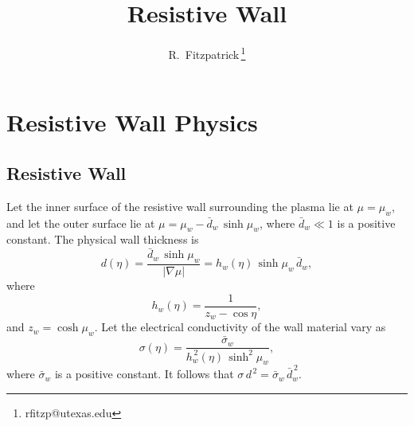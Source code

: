 \documentclass[12pt,prb,aps,notitlepage]{revtex4-1}
\begin{document}
\title{Resistive Wall}
\author{R.~Fitzpatrick\,\footnote{rfitzp@utexas.edu}}
\begin{abstract}
\end{abstract}
\maketitle

\section{Resistive Wall Physics}
\subsection{Resistive Wall}
Let the inner surface of the resistive wall surrounding the plasma lie at $\mu=\mu_w$,
and let the outer surface lie at $\mu=\mu_w-\bar{d}_w\,\sinh\mu_w$,  where $\bar{d}_w\ll 1$ is a positive constant. The physical wall thickness is
\begin{equation}
d(\eta)= \frac{\bar{d}_w\,\sinh\mu_w}{|\nabla \mu|} = h_w(\eta)\,\sinh \mu_w\,\bar{d}_w,
\end{equation}
where
\begin{equation}
h_w(\eta) = \frac{1}{z_w-\cos\eta},
\end{equation}
and $z_w=\cosh\mu_w$. 
Let the electrical conductivity of the wall material vary as
\begin{equation}
\sigma(\eta) = \frac{\bar{\sigma}_w}{h_w^{\,2}(\eta)\,\sinh^2 \mu_w},
\end{equation}
where $\bar{\sigma}_w$ is a positive constant. It follows that $\sigma\,d^{\,2}=\bar{\sigma}_w\,\bar{d}_w^{\,2}$. 
\end{document}
